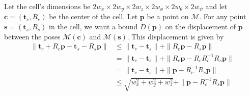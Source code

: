 \documentclass[review]{acmsiggraph}
\newcommand{\cm}{\mathcal{M}}
\newcommand{\bt}{\mathbf{t}}
\newcommand{\bc}{\mathbf{c}}
\newcommand{\bs}{\mathbf{s}}
\newcommand{\bp}{\mathbf{p}}
\begin{document}
Let the cell's dimensions be $2w_x \times 2w_y \times 2w_z \times 2w_{\phi} \times 2w_{\theta} \times 2w_{\psi}$ and let $\bc = (\bt_c, R_c)$ be the center of the cell. Let $\bp$  be a point on $\cm$. For any point $\bs = (\bt_s, R_s)$ in the cell, we want a bound $D(\bp)$ on the displacement of $\bp$ between the poses $\cm(\bc)$ and $\cm(\bs)$. This displacement is given by
\begin{align*}
\|\bt_c + R_c\bp - \bt_s - R_s\bp\| &\leq \|\bt_c -\bt_s\| + \|R_c\bp - R_s\bp\|\\
&= \|\bt_c - \bt_s\| + \|R_c \bp - R_c R_c^{-1}R_s \bp\|\\
&= \|\bt_c - \bt_s\| + \| \bp - R_c^{-1}R_s \bp\|\\
&\leq \sqrt{w_x^2 + w_y^2+w_z^2} + \| \bp - R_c^{-1}R_s \bp\|\\
\end{align*}
\end{document}
